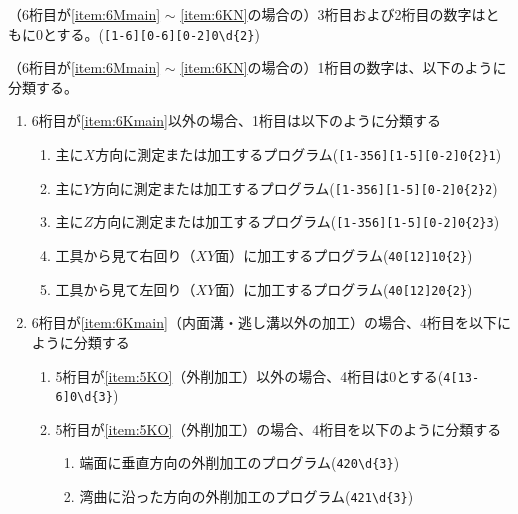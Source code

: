 （6桁目が\ref{item:6Mmain} $\sim$ \ref{item:6KN}\hx の場合の）3桁目および2桁目の数字はともに0とする。(\verb|[1-6][0-6][0-2]0\d{2}|)



（6桁目が\ref{item:6Mmain} $\sim$ \ref{item:6KN}\hx の場合の）1桁目の数字は、以下のように分類する。
\begin{enumerate}[label=\alph*), ref=\alph*)]
\item 6桁目が\ref{item:6Kmain}\hx 以外の場合、1桁目は以下のように分類する
  \begin{enumerate}[label=\arabic*.]
  \item 主に$X$方向に測定または加工するプログラム(\verb|[1-356][1-5][0-2]0{2}1|)
  \item 主に$Y$方向に測定または加工するプログラム(\verb|[1-356][1-5][0-2]0{2}2|)
  \item 主に$Z$方向に測定または加工するプログラム(\verb|[1-356][1-5][0-2]0{2}3|)
  \item 工具から見て右回り（$XY$面）に加工するプログラム(\verb|40[12]10{2}|)
  \item 工具から見て左回り（$XY$面）に加工するプログラム(\verb|40[12]20{2}|)
  \end{enumerate}
\item 6桁目が\ref{item:6Kmain}（内面溝・逃し溝以外の加工）の場合、4桁目を以下にように分類する
  \begin{enumerate}[label=\alph{enumi}\,-\arabic*), leftmargin=\leftmargini]
  \item 5桁目が\ref{item:5KO}（外削加工）以外の場合、4桁目は0とする(\verb|4[13-6]0\d{3}|)
  \item 5桁目が\ref{item:5KO}（外削加工）の場合、4桁目を以下のように分類する
    \begin{enumerate}[label=\arabic*., ref=\arabic*, start=0, leftmargin=*]
    \item 端面に垂直方向の外削加工のプログラム(\verb|420\d{3}|)
    \item 湾曲に沿った方向の外削加工のプログラム(\verb|421\d{3}|)
    \end{enumerate}
  \end{enumerate}
\end{enumerate}
